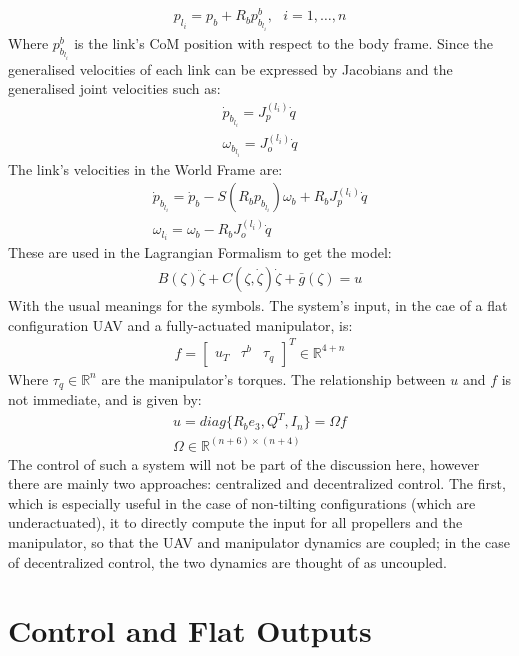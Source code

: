 \begin{gather*}
    p_{l_{i}}=p_{b}+R_{b}p_{b_{l_{i}}}^{b}, \text{ }i=1,\dots,n
\end{gather*}
Where $p_{b_{l_{i}}}^{b}$ is the link's CoM position with respect to the body frame. Since the generalised velocities of each link can be expressed by Jacobians and the generalised joint velocities such as:
\begin{gather*}
    \dot{p}_{b_{l_{i}}}=J_{p}^{(l_{i})}\dot{q}\\
    \omega_{b_{l_{i}}}=J_{o}^{(l_{i})}\dot{q}
\end{gather*}
The link's velocities in the World Frame are:
\begin{gather*}
    \dot{p}_{b_{l_{i}}}=\dot{p}_{b}-S\left(R_{b}p_{b_{l_{i}}}\right)\omega_{b}+R_{b}J_{p}^{(l_{i})}\dot{q}\\
    \omega_{l_{i}}=\omega_{b}-R_{b}J_{o}^{(l_{i})}\dot{q}
\end{gather*}
These are used in the Lagrangian Formalism to get the model:
\begin{gather*}
    B(\zeta)\ddot{\zeta}+C(\zeta,\dot{\zeta})\dot{\zeta}+\bar{g}(\zeta)=u
\end{gather*}
With the usual meanings for the symbols. The system's input, in the cae of a flat configuration UAV and a fully-actuated manipulator, is:
\begin{gather*}
    f=
    \begin{bmatrix}
        u_{T} & \tau^{b} & \tau_{q}
    \end{bmatrix}^{T}\in\mathbb{R}^{4+n}
\end{gather*}
Where $\tau_q\in\mathbb{R}^{n}$ are the manipulator's torques. The relationship between $u$ and $f$ is not immediate, and is given by:
\begin{gather*}
    u=diag\{R_{b}e_{3},Q^{T},I_{n}\}=\Omega f\\
    \Omega\in\mathbb{R}^{(n+6)\times(n+4)}
\end{gather*}
The control of such a system will not be part of the discussion here, however there are mainly two approaches: centralized and decentralized control. The first, which is especially useful in the case of non-tilting configurations (which are underactuated), it to directly compute the input for all propellers and the manipulator, so that the UAV and manipulator dynamics are coupled; in the case of decentralized control, the two dynamics are thought of as uncoupled.
\section{Control and Flat Outputs}

